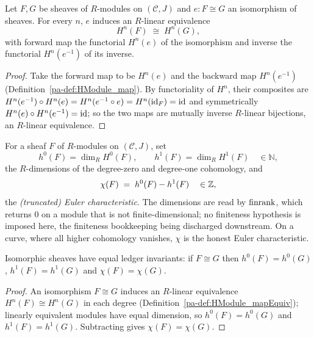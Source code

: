\begin{definition}
  \label{pa-def:HModule_mapEquiv}
  \leanok

  Let \(F, G\) be sheaves of \(R\)-modules on \((\mathcal C, J)\) and \(e : F \cong G\) an
  isomorphism of sheaves. For every \(n\), \(e\) induces an \(R\)-linear equivalence
  \[
    H^n(F) \;\cong\; H^n(G),
  \]
  with forward map the functorial \(H^n(e)\) of the isomorphism and inverse the functorial
  \(H^n(e^{-1})\) of its inverse.
\end{definition}
\begin{proof}
  \leanok
  Take the forward map to be \(H^n(e)\) and the backward map \(H^n(e^{-1})\)
  (Definition~\ref{pa-def:HModule_map}). By functoriality of \(H^n\), their composites are
  \(H^n(e^{-1}) \circ H^n(e) = H^n(e^{-1} \circ e) = H^n(\operatorname{id}_F) = \operatorname{id}\) and symmetrically
  \(H^n(e) \circ H^n(e^{-1}) = \operatorname{id}\); so the two maps are mutually inverse \(R\)-linear
  bijections, an \(R\)-linear equivalence.
\end{proof}

\begin{definition}
  \label{pa-def:h0_h1_chi}
  \leanok

  For a sheaf \(F\) of \(R\)-modules on \((\mathcal C, J)\), set
  \[
    h^0(F) = \dim_R H^0(F), \qquad h^1(F) = \dim_R H^1(F) \quad\in \mathbb N,
  \]
  the \(R\)-dimensions of the degree-zero and degree-one cohomology, and
  \[
    \chi(F) \;=\; h^0(F) - h^1(F) \quad\in \mathbb{Z},
  \]
  the \emph{(truncated) Euler characteristic}. The dimensions are read by \(\operatorname{finrank}\), which
  returns \(0\) on a module that is not finite-dimensional; no finiteness hypothesis is imposed
  here, the finiteness bookkeeping being discharged downstream. On a curve, where all higher
  cohomology vanishes, \(\chi\) is the honest Euler characteristic.
\end{definition}

\begin{theorem}
  \label{pa-thm:chi_congr}
  \leanok

  Isomorphic sheaves have equal ledger invariants: if \(F \cong G\) then
  \(h^0(F) = h^0(G)\), \(h^1(F) = h^1(G)\) and \(\chi(F) = \chi(G)\).
\end{theorem}
\begin{proof}
  \leanok
  An isomorphism \(F \cong G\) induces an \(R\)-linear equivalence
  \(H^n(F) \cong H^n(G)\) in each degree (Definition~\ref{pa-def:HModule_mapEquiv}); linearly
  equivalent modules have equal dimension, so \(h^0(F) = h^0(G)\) and \(h^1(F) = h^1(G)\).
  Subtracting gives \(\chi(F) = \chi(G)\).
\end{proof}

